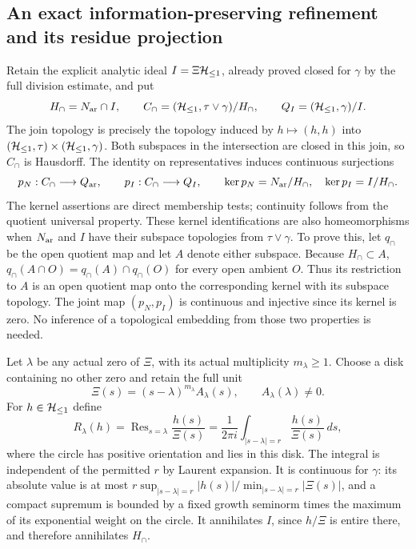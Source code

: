 \subsection{An exact information-preserving refinement and its residue projection}

Retain the explicit analytic ideal $I=\Xi\mathcal H_{\leq 1}$, already proved closed
for $\gamma$ by the full division estimate, and put
\begin{equation}
 H_\cap=N_{\rm ar}\cap I,\qquad
 C_\cap=(\mathcal H_{\leq 1},\tau\vee\gamma)/H_\cap,\qquad
 Q_I=(\mathcal H_{\leq 1},\gamma)/I .
 \label{eq:cq-flow-meet-quotient}
\end{equation}
The join topology is precisely the topology induced by
$h\mapsto(h,h)$ into $(\mathcal H_{\leq 1},\tau)\times(\mathcal H_{\leq 1},\gamma)$.
Both subspaces in the intersection are closed in this join, so
$C_\cap$ is Hausdorff. The identity on representatives induces
continuous surjections
\begin{equation}
 p_N:C_\cap\longrightarrow Q_{\rm ar},\qquad
 p_I:C_\cap\longrightarrow Q_I,\qquad
 \ker p_N=N_{\rm ar}/H_\cap,\quad
 \ker p_I=I/H_\cap .
 \label{eq:cq-flow-meet-maps}
\end{equation}
The kernel assertions are direct membership tests; continuity follows
from the quotient universal property. These kernel identifications
are also homeomorphisms when $N_{\rm ar}$ and $I$ have their subspace
topologies from $\tau\vee\gamma$. To prove this, let $q_\cap$ be
the open quotient map and let $A$ denote either subspace.
Because $H_\cap\subset A$,
$q_\cap(A\cap O)=q_\cap(A)\cap q_\cap(O)$ for every open ambient
$O$. Thus its restriction to $A$ is an open quotient map onto
the corresponding kernel with its subspace topology.
The joint map $(p_N,p_I)$ is continuous and injective since its
kernel is zero. No inference of a topological embedding from those
two properties is needed.

Let $\lambda$ be any actual zero of $\Xi$, with its actual
multiplicity $m_\lambda\geq1$. Choose a disk containing no other zero
and retain the full unit
\[
 \Xi(s)=(s-\lambda)^{m_\lambda}A_\lambda(s),
 \qquad A_\lambda(\lambda)\ne0.
\]
For $h\in\mathcal H_{\leq 1}$ define
\begin{equation}
 R_\lambda(h)
 =\operatorname{Res}_{s=\lambda}\frac{h(s)}{\Xi(s)}
 =\frac1{2\pi i}\int_{|s-\lambda|=r}
                    \frac{h(s)}{\Xi(s)}\,ds ,
 \label{eq:cq-flow-residue-functional}
\end{equation}
where the circle has positive orientation and lies in this disk.
The integral is independent of the permitted $r$ by Laurent
expansion. It is continuous for $\gamma$: its absolute value is
at most $r\sup_{|s-\lambda|=r}|h(s)|/
\min_{|s-\lambda|=r}|\Xi(s)|$, and a compact supremum is bounded
by a fixed growth seminorm times the maximum of its exponential
weight on the circle. It annihilates $I$, since $h/\Xi$ is entire
there, and therefore annihilates $H_\cap$.

